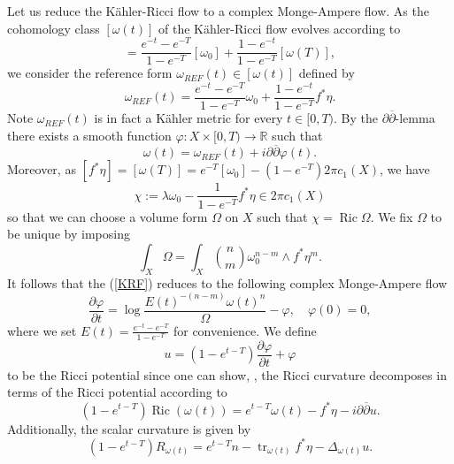 \documentclass[12pt]{article}
\numberwithin{equation}{section}
\newcommand{\R}{\mathbb{R}}
\renewcommand{\d}{\partial}
\newcommand{\dbar}{\overline{\partial}}
\DeclareMathOperator{\Ric}{Ric}
\DeclareMathOperator{\tr}{tr}
\begin{document}
\noindent Let us reduce the K\"ahler-Ricci flow to a complex Monge-Ampere flow. As the cohomology class $[\omega(t)]$ of the K\"ahler-Ricci flow evolves according to
\begin{equation*}
    [\omega(t)] = \frac{e^{-t}-e^{-T}}{1-e^{-T}}[\omega_0] + \frac{1-e^{-t}}{1-e^{-T}} [\omega(T)],
\end{equation*}
we consider the reference form $\omega_{REF}(t) \in [\omega(t)]$ defined by
\begin{equation*}
    \omega_{REF}(t) = \frac{e^{-t}-e^{-T}}{1-e^{-T}} \omega_0 + \frac{1-e^{-t}}{1-e^{-T}} f^* \eta.
\end{equation*}
Note $\omega_{REF}(t)$ is in fact a K\"ahler metric for every $t \in [0,T)$. By the $\d\dbar$-lemma there exists a smooth function $\varphi: X \times [0,T) \to \R$ such that
\begin{equation*}
    \omega(t) = \omega_{REF}(t) + i\d\dbar \varphi(t).
\end{equation*}
Moreover, as $[f^*\eta] = [\omega(T)] = e^{-T}[\omega_0] - (1-e^{-T}) 2\pi c_1(X)$, we have
\begin{equation*}
    \chi := \lambda \omega_0 -\frac{1}{1-e^{-T}} f^*\eta\in 2\pi c_1(X)
\end{equation*}
so that we can choose a volume form $\Omega$ on $X$ such that $\chi = \Ric \Omega$. We fix $\Omega$ to be unique by imposing
\begin{equation*}
    \int_X \Omega = \int_X {n\choose m} \omega_0^{n-m} \wedge f^*\eta^m.
\end{equation*}
It follows that the (\ref{KRF}) reduces to the following complex Monge-Ampere flow
\begin{equation}\label{CMA}\tag{CMA}
    \frac{\d \varphi}{\d t} = \log\frac{E(t)^{-(n-m)}\omega(t)^n}{\Omega}-\varphi, \quad \varphi(0) = 0,
\end{equation}
where we set $E(t) = \frac{e^{-t}-e^{-T}}{1-e^{-T}}$ for convenience. We define
\begin{equation*}
u = (1-e^{t-T}) \frac{\d \varphi}{\d t} + \varphi
\end{equation*}
to be the Ricci potential since one can show, \cite{Z10}, the Ricci curvature decomposes in terms of the Ricci potential according to
\begin{equation*}
    (1-e^{t-T})\Ric (\omega(t)) = e^{t-T}\omega(t) - f^*\eta - i\d\dbar  u.
\end{equation*}
Additionally, the scalar curvature is given by
\begin{equation}\label{scalar_curvature_formula}
    (1-e^{t-T}) R_{\omega(t)} = e^{t-T}n - \tr_{\omega(t)} f^*\eta - \Delta_{\omega(t)} u.
\end{equation}
\end{document}
